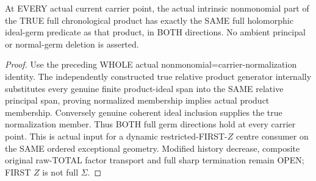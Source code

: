 \begin{theorem}
\label{hir:sharp-original-chronological-full-product-nonmonomial-germ-dictionary}
\leanok
At EVERY actual current carrier point, the actual intrinsic nonmonomial
part of the TRUE full chronological product has exactly the SAME full
holomorphic ideal-germ predicate as that product, in BOTH directions.
No ambient principal or normal-germ deletion is asserted.
\end{theorem}
\begin{proof}
Use the preceding WHOLE actual nonmonomial=carrier-normalization identity.
The independently constructed true relative product generator internally
substitutes every genuine finite product-ideal span into the SAME relative
principal span, proving normalized membership implies actual product
membership. Conversely genuine coherent ideal inclusion supplies the true
normalization member. Thus BOTH full germ directions hold at every carrier
point. This is actual input for a dynamic restricted-FIRST-$Z$ centre
consumer on the SAME ordered exceptional geometry. Modified history
decrease, composite original raw-TOTAL factor transport and full sharp
termination remain OPEN; FIRST $Z$ is not full $\Sigma$.
\end{proof}
